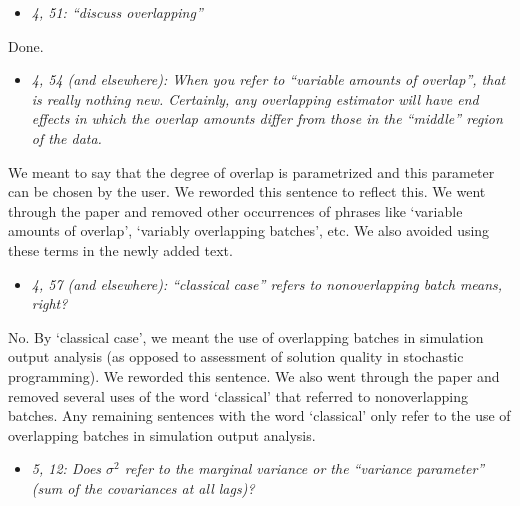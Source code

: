 \documentclass[11pt,notitlepage,onecolumn]{article}
\newcommand{\noi}{\noindent}
\begin{document}
\begin{itemize}
\item[] \textit{4, 51: ``discuss overlapping''}
\end{itemize}

\noi
Done.  
\medskip 


\begin{itemize}
\item[] \textit{4, 54 (and elsewhere): When you refer to ``variable amounts of overlap'', that is really nothing new. Certainly, any overlapping estimator will have end effects in which the overlap amounts differ from those in the ``middle'' region of the data.}
\end{itemize}

\noi
We meant to say that the degree of overlap is parametrized and this parameter can be chosen by the user. 
We reworded this sentence to reflect this. 
We went through the paper and removed other occurrences of phrases like `variable amounts of overlap', `variably overlapping batches', etc.
We also avoided using these terms in the newly added text. 
\medskip 



\begin{itemize}
\item[] \textit{4, 57 (and elsewhere): ``classical case'' refers to nonoverlapping batch means, right?}
\end{itemize}

\noi
No. By `classical case', we meant the use of overlapping batches in simulation output analysis (as opposed to assessment of solution quality in stochastic programming). 
We reworded this sentence. 
We also went through the paper and removed several uses of the word `classical' that referred to nonoverlapping batches.
Any remaining sentences with the word `classical' only refer to the use of overlapping batches in simulation output analysis. 
\medskip 



\begin{itemize}
\item[] \textit{5, 12: Does $\sigma^2$ refer to the marginal variance or the ``variance parameter'' (sum of the covariances at all lags)?}
\end{itemize}
\end{document}
